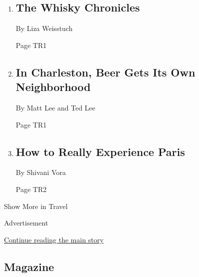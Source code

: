 \begin{enumerate}
\def\labelenumi{\arabic{enumi}.}
\item
  \href{/2018/04/23/travel/islay-scotland-whisky-alfred-barnard.html}{}

  \hypertarget{the-whisky-chronicles}{%
  \subsection{The Whisky Chronicles}\label{the-whisky-chronicles}}

  By Liza Weisstuch

  Page TR1
\item
  \href{/2018/04/25/travel/charleston-brewery-district-beer.html}{}

  \hypertarget{in-charleston-beer-gets-its-own-neighborhood}{%
  \subsection{In Charleston, Beer Gets Its Own
  Neighborhood}\label{in-charleston-beer-gets-its-own-neighborhood}}

  By Matt Lee and Ted Lee

  Page TR1
\item
  \href{/2018/04/24/travel/paris-walking-tips.html}{}

  \hypertarget{how-to-really-experience-paris}{%
  \subsection{How to Really Experience
  Paris}\label{how-to-really-experience-paris}}

  By Shivani Vora

  Page TR2
\end{enumerate}

Show More in Travel

Advertisement

\protect\hyperlink{after-mid5}{Continue reading the main story}

\hypertarget{magazine}{%
\subsection{Magazine}\label{magazine}}


